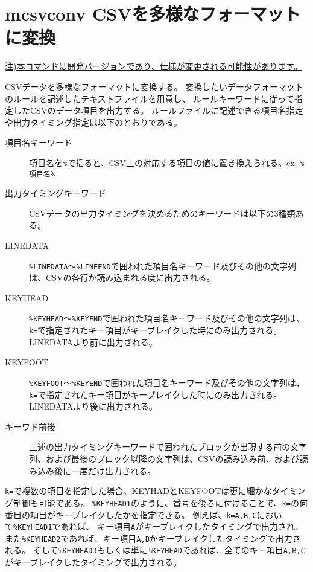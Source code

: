 
%

\section{mcsvconv CSVを多様なフォーマットに変換\label{sect:mcsvconv}}
\underline{注)本コマンドは開発バージョンであり、仕様が変更される可能性があります。}

CSVデータを多様なフォーマットに変換する。
変換したいデータフォーマットのルールを記述したテキストファイルを用意し、
ルールキーワードに従って指定したCSVのデータ項目を出力する。
ルールファイルに記述できる項目名指定や出力タイミング指定は以下のとおりである。

\begin{description}
 \item[項目名キーワード] 項目名を\verb|%|で括ると、CSV上の対応する項目の値に置き換えられる。ex. \verb|%項目名%|
 \item[出力タイミングキーワード] CSVデータの出力タイミングを決めるためのキーワードは以下の3種類ある。
 \item[LINEDATA] \verb|%LINEDATA|〜\verb|%LINEEND|で囲われた項目名キーワード及びその他の文字列は、CSVの各行が読み込まれる度に出力される。
 \item[KEYHEAD] \verb|%KEYHEAD|〜\verb|%KEYEND|で囲われた項目名キーワード及びその他の文字列は、\verb|k=|で指定されたキー項目がキーブレイクした時にのみ出力される。LINEDATAより前に出力される。
 \item[KEYFOOT] \verb|%KEYFOOT|〜\verb|%KEYEND|で囲われた項目名キーワード及びその他の文字列は、\verb|k=|で指定されたキー項目がキーブレイクした時にのみ出力される。LINEDATAより後に出力される。
 \item[キーワド前後] 上述の出力タイミングキーワードで囲われたブロックが出現する前の文字列、および最後のブロック以降の文字列は、CSVの読み込み前、および読み込み後に一度だけ出力される。
\end{description}

\verb|k=|で複数の項目を指定した場合、KEYHADとKEYFOOTは更に細かなタイミング制御も可能である。
\verb|%KEYHEAD1|のように、番号を後ろに付けることで、\verb|k=|の何番目の項目がキーブレイクしたかを指定できる。
例えば、\verb|k=A,B,C|において\verb|%KEYHEAD1|であれば、
キー項目\verb|A|がキーブレイクしたタイミングで出力され、
また\verb|%KEYHEAD2|であれば、キー項目\verb|A,B|がキーブレイクしたタイミングで出力される。
そして\verb|%KEYHEAD3|もしくは単に\verb|%KEYHEAD|であれば、全てのキー項目\verb|A,B,C|がキーブレイクしたタイミングで出力される。

